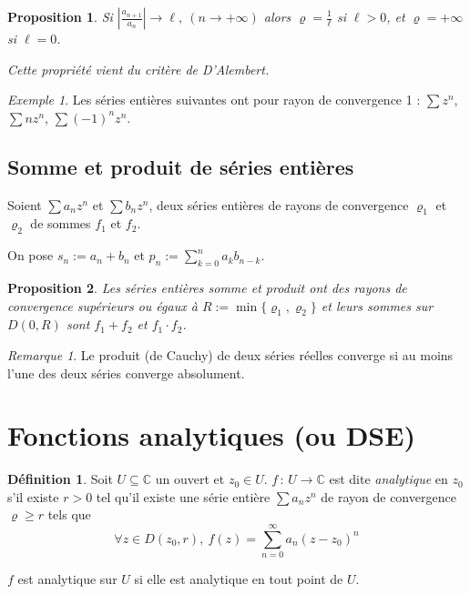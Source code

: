 \documentclass[]{article}
\newtheorem{myproposition}{Proposition}
\theoremstyle{remark}
\newtheorem{myrem}{Remarque}
\newtheorem{myexmpl}{Exemple}
\theoremstyle{definition}
\newtheorem{mydef}{Définition}
\newcommand{\funcshort}[3]{
	#1 \, : \, #2 \longrightarrow #3
}
\newcommand{\DS}{\displaystyle}
\begin{document}
\begin{myproposition}
	Si $\displaystyle \left|\frac{a_{n+1}}{a_n}\right| \longrightarrow \ell, ~ (n \to +\infty)$ alors $\DS \varrho = \frac{1}{\ell}$ si $\ell > 0$, et $\varrho = +\infty$ si $\ell = 0$.
	
	Cette propriété vient du critère de D'Alembert.
\end{myproposition}

\begin{myexmpl}
	Les séries entières suivantes ont pour rayon de convergence 1 : $\sum z^n$, $\sum n z^n$, $\sum (-1)^n z^n$.
\end{myexmpl}

\subsection*{Somme et produit de séries entières}

Soient $\sum a_n z^n$ et $\sum b_n z^n$, deux séries entières de rayons de convergence $\varrho_1$ et $\varrho_2$ de sommes $f_1$ et $f_2$.

On pose $s_n := a_n + b_n$ et $\displaystyle p_n := \sum_{k = 0}^{n} a_k b_{n - k}$. 

\begin{myproposition}
	Les séries entières somme et produit ont des rayons de convergence supérieurs ou égaux à $R := \min \{\varrho_1, \varrho_2\}$ et leurs sommes sur $D(0, R)$ sont $f_1+f_2$ et $f_1 \cdot f_2$.
\end{myproposition}

\begin{myrem}
	Le produit (de Cauchy) de deux séries réelles converge si au moins l'une des deux séries converge absolument.
\end{myrem}

\section{Fonctions analytiques (ou DSE)}

\begin{mydef}
	Soit $U \subseteq \mathbb{C}$ un ouvert et $z_0 \in U$. $\funcshort{f}{U}{\mathbb{C}}$ est dite \textit{analytique} en $z_0$  s'il existe $r > 0$ tel qu'il existe une série entière $\sum a_n z^n$ de rayon de convergence $\varrho \geqslant r$ tels que $$\forall z \in D(z_0, r), ~ f(z) = \sum_{n = 0}^{\infty} a_n (z - z_0)^n$$
	
	$f$ est analytique sur $U$ si elle est analytique en tout point de $U$.
\end{mydef}
\end{document}

